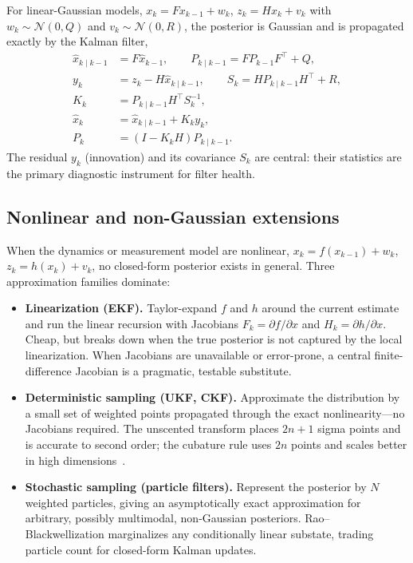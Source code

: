 \documentclass[10pt,conference]{IEEEtran}
\begin{document}
For linear-Gaussian models, $x_k = F x_{k-1} + w_k$, $z_k = H x_k + v_k$
with $w_k \sim \mathcal{N}(0,Q)$ and $v_k \sim \mathcal{N}(0,R)$, the
posterior is Gaussian and is propagated exactly by the Kalman filter,
\begin{align}
\hat{x}_{k\mid k-1} &= F \hat{x}_{k-1},\qquad
P_{k\mid k-1} = F P_{k-1} F^{\top} + Q, \\
y_k &= z_k - H\hat{x}_{k\mid k-1}, \qquad
S_k = H P_{k\mid k-1} H^{\top} + R, \\
K_k &= P_{k\mid k-1} H^{\top} S_k^{-1}, \\
\hat{x}_k &= \hat{x}_{k\mid k-1} + K_k y_k, \\
P_k &= (I - K_k H) P_{k\mid k-1}.
\end{align}
The residual $y_k$ (innovation) and its covariance $S_k$ are central: their
statistics are the primary diagnostic instrument for filter health.

\subsection{Nonlinear and non-Gaussian extensions}

When the dynamics or measurement model are nonlinear, $x_k = f(x_{k-1}) +
w_k$, $z_k = h(x_k) + v_k$, no closed-form posterior exists in general. Three
approximation families dominate:

\begin{itemize}
\item \textbf{Linearization (EKF).} Taylor-expand $f$ and $h$ around the
current estimate and run the linear recursion with Jacobians
$F_k=\partial f/\partial x$ and $H_k=\partial h/\partial x$. Cheap, but
breaks down when the true posterior is not captured by the local linearization.
When Jacobians are unavailable or error-prone, a central finite-difference
Jacobian is a pragmatic, testable substitute.
\item \textbf{Deterministic sampling (UKF, CKF).} Approximate the
distribution by a small set of weighted points propagated through the exact
nonlinearity---no Jacobians required. The unscented transform places
$2n+1$ sigma points and is accurate to second order; the cubature rule uses
$2n$ points and scales better in high dimensions~\cite{arasaratnam2009cubature}.
\item \textbf{Stochastic sampling (particle filters).} Represent the
posterior by $N$ weighted particles, giving an asymptotically exact
approximation for arbitrary, possibly multimodal, non-Gaussian posteriors.
Rao--Blackwellization marginalizes any conditionally linear substate, trading
particle count for closed-form Kalman updates.
\end{itemize}
\end{document}
